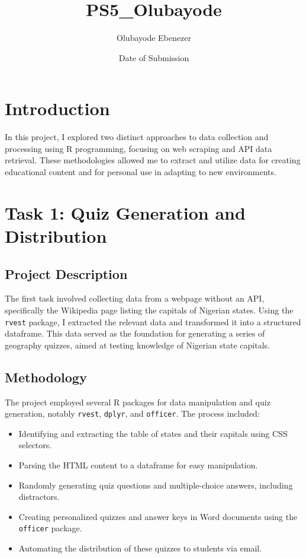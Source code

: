 \documentclass{article}
\title{PS5\_Olubayode}
\author{Olubayode Ebenezer}
\date{Date of Submission}
\begin{document}
\maketitle

\section{Introduction}

In this project, I explored two distinct approaches to data collection and processing using R programming, focusing on web scraping and API data retrieval. These methodologies allowed me to extract and utilize data for creating educational content and for personal use in adapting to new environments.

\section{Task 1: Quiz Generation and Distribution}

\subsection{Project Description}

The first task involved collecting data from a webpage without an API, specifically the Wikipedia page listing the capitals of Nigerian states. Using the \texttt{rvest} package, I extracted the relevant data and transformed it into a structured dataframe. This data served as the foundation for generating a series of geography quizzes, aimed at testing knowledge of Nigerian state capitals.

\subsection{Methodology}

The project employed several R packages for data manipulation and quiz generation, notably \texttt{rvest}, \texttt{dplyr}, and \texttt{officer}. The process included:

\begin{itemize}
    \item Identifying and extracting the table of states and their capitals using CSS selectors.
    \item Parsing the HTML content to a dataframe for easy manipulation.
    \item Randomly generating quiz questions and multiple-choice answers, including distractors.
    \item Creating personalized quizzes and answer keys in Word documents using the \texttt{officer} package.
    \item Automating the distribution of these quizzes to students via email.
\end{itemize}
\end{document}
